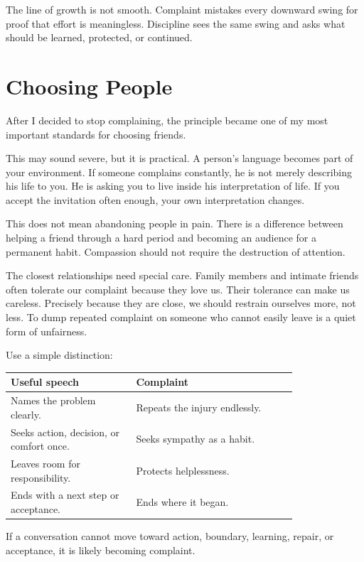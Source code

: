 The line of growth is not smooth. Complaint mistakes every downward swing for proof that effort is meaningless. Discipline sees the same swing and asks what should be learned, protected, or continued.

\section*{Choosing People}

After I decided to stop complaining, the principle became one of my most important standards for choosing friends.

This may sound severe, but it is practical. A person's language becomes part of your environment. If someone complains constantly, he is not merely describing his life to you. He is asking you to live inside his interpretation of life. If you accept the invitation often enough, your own interpretation changes.

This does not mean abandoning people in pain. There is a difference between helping a friend through a hard period and becoming an audience for a permanent habit. Compassion should not require the destruction of attention.

The closest relationships need special care. Family members and intimate friends often tolerate our complaint because they love us. Their tolerance can make us careless. Precisely because they are close, we should restrain ourselves more, not less. To dump repeated complaint on someone who cannot easily leave is a quiet form of unfairness.

Use a simple distinction:

\begin{center}
\begin{tabular}{p{0.35\linewidth}p{0.45\linewidth}}
\hline
Useful speech & Complaint \\
\hline
Names the problem clearly. & Repeats the injury endlessly. \\
Seeks action, decision, or comfort once. & Seeks sympathy as a habit. \\
Leaves room for responsibility. & Protects helplessness. \\
Ends with a next step or acceptance. & Ends where it began. \\
\hline
\end{tabular}
\end{center}

If a conversation cannot move toward action, boundary, learning, repair, or acceptance, it is likely becoming complaint.

